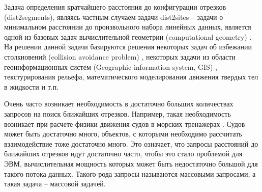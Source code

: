 
\startprefacepage

Задача определения кратчайшего расстояния до конфигурации отрезков
(dist2segments), являясь частным случаем задачи dist2sites – задачи о
минимальном расстоянии до произвольного набора линейных данных,
является одной из базовых задач вычислительной геометрии (computational
geometry) \cite{PrSh}. На решении данной задачи базируются решения некоторых задач
об избежании столкновений (collision avoidance problem) \cite{MarNav}, некоторых задачи
из области геоинформационных систем (Geographic information system, GIS) \cite{CGinGIS},
текстурирования рельефа, математического моделирования движения твердых
тел в жидкости и т.п.

Очень часто возникает необходимость в достаточно
больших количествах запросов на поиск ближайших отрезков.
Например, такая необходимость возникает при расчете физики движения судов в морских
тренажерах \cite{MarNav}. Судов может быть достаточно много, объектов, с которыми
необходимо рассчитать взаимодействие тоже достаточно много. Это означает,
что запросы расстояний до ближайших отрезков идут достаточно часто, чтобы это стало проблемой
для ЭВМ, вычислительная мощность которых может быть недостаточно
большой для такого потока данных. Такого рода запросы называются
массовыми запросами, а такая задача – массовой задачей.

